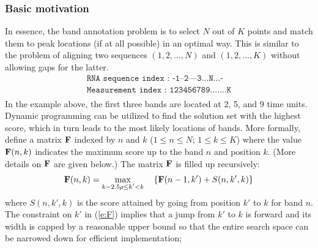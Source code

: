 \subsubsection{Basic motivation}
In essence, the band annotation problem is to select $N$ out of $K$ points and match them to peak locations (if at all possible) in an optimal way. This is similar to the problem of aligning two sequences $(1,2,\ldots,N)$ and $(1,2,\ldots,K)$ without allowing gaps for the latter.
\begin{align*}
\texttt{RNA sequence index    : -1--2---3...N...-}\\
\texttt{Measurement  index    : 123456789.......K}\\
\end{align*}
In the example above, the first three bands are located at 2, 5, and 9 time units.  Dynamic programming can be utilized to find the solution set with the highest score, which in turn leads to the most likely locations of bands. More formally, define a matrix ${\mathbf{F}}$ indexed by $n$ and $k$ ($1 \le n \le N$; $1 \le k \le K$) where the value ${\mathbf{F}}(n,k)$ indicates the maximum score up to the band $n$ and position $k$. (More details on ${\mathbf{F}}$ are given below.) The matrix ${\mathbf{F}}$ is filled up recursively:
%
\begin{equation}\label{e:F}
{\mathbf{F}}(n,k) = \max_{\substack{k-2.5\rho \le k' < k}}\quad \left\{ {\mathbf{F}}(n-1,k') + S(n,k',k) \right\}
\end{equation}
%
where $S(n,k',k)$ is the score attained by going from position $k'$ to $k$ for band $n$.  The constraint on $k'$ in (\ref{e:F}) implies that a jump from $k'$ to $k$ is forward and its width is capped by a reasonable upper bound so that the entire search space can be narrowed down for efficient implementation; 


